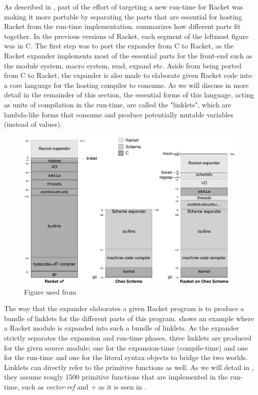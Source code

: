 \label{subsec:racket-expand}

As described in , part of the effort of targeting a
new run-time for Racket was making it more portable by separating the
parts that are essential for hosting Racket from the run-time
implementation.  summarizes how different
parts fit together. In the previous versions of Racket, each segment
of the leftmost figure was in C. The first step was to port the
expander from C to Racket, as the Racket expander implements most of
the essential parts for the front-end such as the module system, macro
system, read, expand etc. Aside from being ported from C to Racket,
the expander is also made to elaborate given Racket code into a core
language for the hosting compiler to consume. As we will discuss in
more detail in the remainder of this section, the essential forms of
this language, acting as units of compilation in the run-time, are
called the "linklets", which are lambda-like forms that consume and
produce potentially mutable variables (instead of values).

\begin{figure}[tbp]
  \centering
  \includegraphics[scale=0.3]{img/racket-portable}
  \caption{Figure used from \cite{racket-on-chez-19}}
  \label{fig:racket-portable}
\end{figure}


The way that the expander elaborates a given Racket program is to
produce a bundle of linklets for the different parts of this
program.  shows an example where a
Racket module is expanded into such a bundle of linklets. As the
expander strictly separates the expansion and run-time phases, three
linklets are produced for the given source module; one for the
expansion-time (compile-time) and one for the run-time and one for the
literal syntax objects to bridge the two worlds. Linklets can directly
refer to the primitive functions as well. As we will detail in
, they assume rougly 1500 primitive functions
that are implemented in the run-time, such as \emph{vector-ref} and
\emph{+} as it is seen in .


